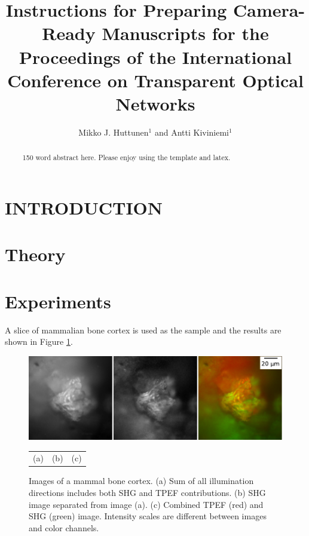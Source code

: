 \documentclass[letterpaper,10pt]{article}
\begin{document}
\title{Instructions for Preparing Camera-Ready Manuscripts for
the Proceedings of the International Conference on Transparent Optical Networks}


\author{Mikko J. Huttunen$^{1}$ and Antti Kiviniemi$^{1}$}

\address{{\affN}Photonics Laboratory, Physics Unit, Tampere University, Tampere, Finland}


\justify
\begin{abstract} ~150 word abstract here. Please enjoy using the template and latex.
\end{abstract}
%

\section{INTRODUCTION}

\nocite{*} %

\section{Theory}
%
\section{Experiments}
A slice of mammalian bone cortex is used as the sample and the results are shown in Figure \ref{fig:bone}.

\begin{figure}[h!!]
	\begin{center}
		\includegraphics[width=\linewidth]{24508.pdf}
	\end{center}
	\vspace{-14mm}
	\begin{tabularx}{\textwidth}{XXX}
		\color{white}(a) & \color{white}(b) & \color{white}(c)
	\end{tabularx}
	\caption{Images of a mammal bone cortex. (a) Sum of all illumination directions includes both SHG and TPEF contributions. (b) SHG image separated from image (a). (c) Combined TPEF (red) and SHG (green) image. Intensity scales are different between images and color channels.}
	\label{fig:bone}
\end{figure}
\end{document}
